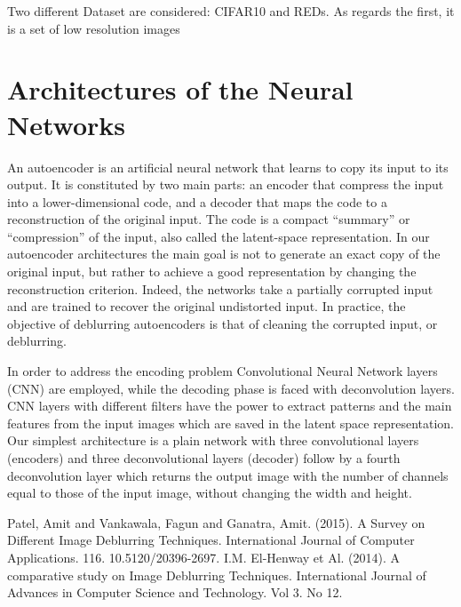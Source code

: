 \documentclass[12pt,a4paper]{article}
\begin{document}
Two different Dataset are considered: CIFAR10 and REDs. As regards the first, it is a set of low resolution images  

\section{Architectures of the Neural Networks}
An autoencoder is an artificial neural network that learns to copy its input to its output. It is constituted by two main parts: an encoder that compress the input into a lower-dimensional code, and a decoder that maps the code to a reconstruction of the original input. The code is a compact “summary” or “compression” of the input, also called the latent-space representation. In our autoencoder architectures the main goal is not to generate an exact copy of the original input, but rather to achieve a good representation by changing the reconstruction criterion. Indeed, the networks take a partially corrupted input and are trained to recover the original undistorted input. In practice, the objective of deblurring autoencoders is that of cleaning the corrupted input, or deblurring. 

In order to address the encoding problem Convolutional Neural Network layers (CNN) are employed, while the decoding phase is faced with deconvolution layers. CNN layers with different filters have the power to extract patterns and the main features from the input images which are saved in the latent space representation. Our simplest architecture is a plain network with three convolutional layers (encoders) and three deconvolutional layers (decoder) follow by a fourth deconvolution layer which returns the output image with the number of channels equal to those of the input image, without changing the width and height.


\newpage
\begin{thebibliography}{99}
  Patel, Amit and Vankawala, Fagun and Ganatra, Amit. (2015). A Survey on Different Image Deblurring Techniques. International Journal of Computer Applications. 116. 10.5120/20396-2697. 
 I.M. El-Henway et Al. (2014). A comparative study on Image Deblurring Techniques. International Journal of Advances in Computer Science and Technology. Vol 3. No 12.

\end{thebibliography}
\end{document}

